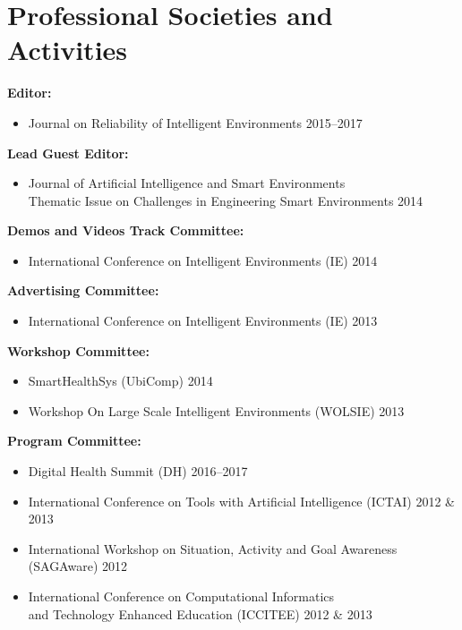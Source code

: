 \AOCLine
\section*{Professional Societies and Activities}

\textbf{Editor:}
\begin{itemize}
	\item{Journal on Reliability of Intelligent Environments \hfill 2015--2017}
\end{itemize}

\textbf{Lead Guest Editor:}
\begin{itemize}
	\item{Journal of Artificial Intelligence and Smart Environments \\ \indent Thematic Issue on Challenges in Engineering Smart Environments \hfill 2014} 
\end{itemize}


\textbf{Demos and Videos Track Committee:}
\begin{itemize}
	\item{International Conference on Intelligent Environments (IE) \hfill 2014} 
\end{itemize}


\textbf{Advertising Committee:}
\begin{itemize}
	\item{International Conference on Intelligent Environments (IE) \hfill 2013}
\end{itemize}

\textbf{Workshop Committee:}
\begin{itemize}
	\item{SmartHealthSys (UbiComp) \hfill 2014}
	\item{Workshop On Large Scale Intelligent Environments (WOLSIE) \hfill 2013}
\end{itemize}

\textbf{Program Committee:}

\begin{itemize}
	\item{Digital Health Summit (DH) \hfill 2016--2017}
	\item{International Conference on Tools with Artificial Intelligence (ICTAI) \hfill 2012 \& 2013}
	\item{International Workshop on Situation, Activity and Goal Awareness (SAGAware) \hfill 2012}
	\item{International Conference on Computational Informatics \\ \indent and Technology Enhanced Education (ICCITEE) \hfill 2012 \& 2013}
\end{itemize}


